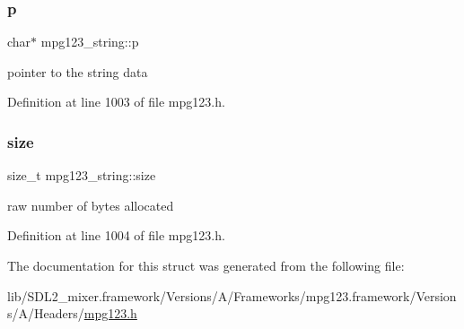 \mbox{\label{structmpg123__string_a25dc48dd64c1df5e56bc2260b74dc5d2}} 
\subsubsection{\texorpdfstring{p}{p}}
{\footnotesize\ttfamily char$\ast$ mpg123\+\_\+string\+::p}

pointer to the string data 

Definition at line 1003 of file mpg123.\+h.

\mbox{\label{structmpg123__string_afa783be283e7e2f287f0b8a129701eba}} 
\subsubsection{\texorpdfstring{size}{size}}
{\footnotesize\ttfamily size\+\_\+t mpg123\+\_\+string\+::size}

raw number of bytes allocated 

Definition at line 1004 of file mpg123.\+h.



The documentation for this struct was generated from the following file\+:\begin{DoxyCompactItemize}
\item 
lib/\+S\+D\+L2\+\_\+mixer.\+framework/\+Versions/\+A/\+Frameworks/mpg123.\+framework/\+Versions/\+A/\+Headers/\mbox{\hyperlink{mpg123_8h}{mpg123.\+h}}\end{DoxyCompactItemize}
